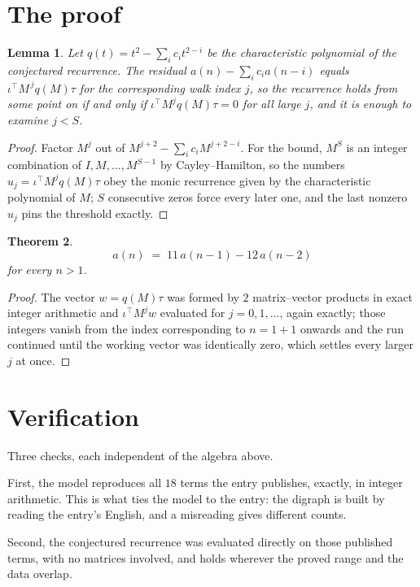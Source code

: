 \documentclass[11pt,a4paper]{article}
\theoremstyle{plain}
\newtheorem{theorem}{Theorem}
\newtheorem{lemma}[theorem]{Lemma}
\theoremstyle{definition}
\begin{document}
\section{The proof}

\begin{lemma}\label{lem:crit}
Let $q(t)=t^{2}-\sum_i c_it^{2-i}$ be the characteristic polynomial of the
conjectured recurrence. The residual $a(n)-\sum_ic_ia(n-i)$ equals
$\iota^{\!\top}M^{\,j}q(M)\tau$ for the corresponding walk index $j$, so the recurrence
holds from some point on if and only if $\iota^{\!\top}M^{j}q(M)\tau=0$ for all large $j$,
and it is enough to examine $j<S$.
\end{lemma}

\begin{proof}
Factor $M^{j}$ out of $M^{j+2}-\sum_ic_iM^{j+2-i}$. For the bound, $M^{S}$
is an integer combination of $I,M,\dots,M^{S-1}$ by Cayley--Hamilton, so the numbers
$u_j=\iota^{\!\top}M^{j}q(M)\tau$ obey the monic recurrence given by the characteristic
polynomial of $M$; $S$ consecutive zeros force every later one, and the last nonzero $u_j$
pins the threshold exactly.
\end{proof}

\begin{theorem}
\[
a(n)\;=\;11\,a(n-1) - 12\,a(n-2)
\]
for every $n>1$.
\end{theorem}

\begin{proof}
The vector $w=q(M)\tau$ was formed by $2$ matrix--vector products in exact integer
arithmetic and $\iota^{\!\top}M^{j}w$ evaluated for $j=0,1,\dots$, again exactly; those
integers vanish from the index corresponding to $n=1+1$ onwards and the run continued
until the working vector was identically zero, which settles every larger $j$ at once.
\end{proof}

\section{Verification}

Three checks, each independent of the algebra above.

First, the model reproduces all $18$ terms the entry publishes, exactly, in integer
arithmetic. This is what ties the model to the entry: the digraph is built by reading the
entry's English, and a misreading gives different counts.

Second, the conjectured recurrence was evaluated directly on those published terms, with no
matrices involved, and holds wherever the proved range and the data overlap.
\end{document}
